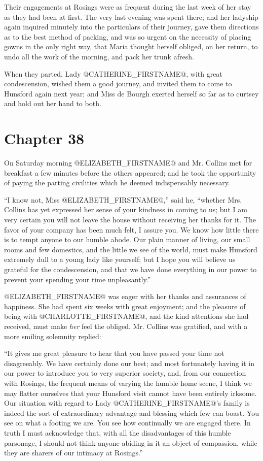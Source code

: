 Their engagements at Rosings were as frequent during the last week of
her stay as they had been at first. The very last evening was spent
there; and her ladyship again inquired minutely into the particulars of
their journey, gave them directions as to the best method of packing,
and was so urgent on the necessity of placing gowns in the only right
way, that Maria thought herself obliged, on her return, to undo all the
work of the morning, and pack her trunk afresh.

When they parted, Lady @CATHERINE_FIRSTNAME@, with great condescension, wished them
a good journey, and invited them to come to Hunsford again next year;
and Miss de Bourgh exerted herself so far as to curtsey and hold out her
hand to both.



\chapter*{Chapter 38}


On Saturday morning @ELIZABETH_FIRSTNAME@ and Mr. Collins met for breakfast a few
minutes before the others appeared; and he took the opportunity of
paying the parting civilities which he deemed indispensably necessary.

``I know not, Miss @ELIZABETH_FIRSTNAME@,'' said he, ``whether Mrs. Collins has yet
expressed her sense of your kindness in coming to us; but I am very
certain you will not leave the house without receiving her thanks for
it. The favor of your company has been much felt, I assure you. We
know how little there is to tempt anyone to our humble abode. Our plain
manner of living, our small rooms and few domestics, and the little we
see of the world, must make Hunsford extremely dull to a young lady like
yourself; but I hope you will believe us grateful for the condescension,
and that we have done everything in our power to prevent your spending
your time unpleasantly.''

@ELIZABETH_FIRSTNAME@ was eager with her thanks and assurances of happiness. She
had spent six weeks with great enjoyment; and the pleasure of being with
@CHARLOTTE_FIRSTNAME@, and the kind attentions she had received, must make \textit{her}
feel the obliged. Mr. Collins was gratified, and with a more smiling
solemnity replied:

``It gives me great pleasure to hear that you have passed your time not
disagreeably. We have certainly done our best; and most fortunately
having it in our power to introduce you to very superior society, and,
from our connection with Rosings, the frequent means of varying the
humble home scene, I think we may flatter ourselves that your Hunsford
visit cannot have been entirely irksome. Our situation with regard to
Lady @CATHERINE_FIRSTNAME@'s family is indeed the sort of extraordinary advantage
and blessing which few can boast. You see on what a footing we are. You
see how continually we are engaged there. In truth I must acknowledge
that, with all the disadvantages of this humble parsonage, I should
not think anyone abiding in it an object of compassion, while they are
sharers of our intimacy at Rosings.''

